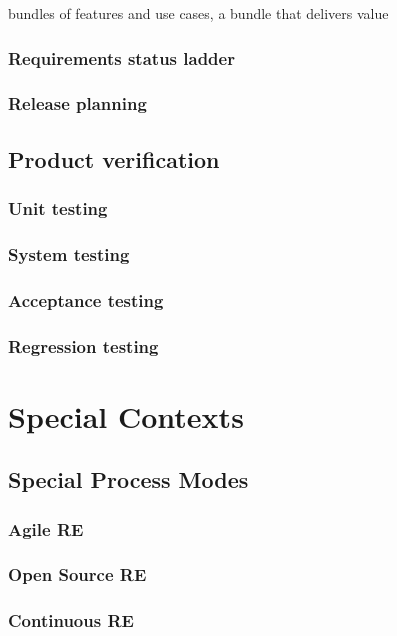 \documentclass{reqengbook}
\begin{document}
bundles of features and use cases, a bundle that delivers value

\section{Requirements status ladder}

\section{Release planning} 

\chapter{Product verification}
\section{Unit testing}
\section{System testing}
\section{Acceptance testing}
\section{Regression testing}

\part{Special Contexts}

\chapter{Special Process Modes}

\section{Agile RE}

\section{Open Source RE}

\section{Continuous RE}
\end{document}
